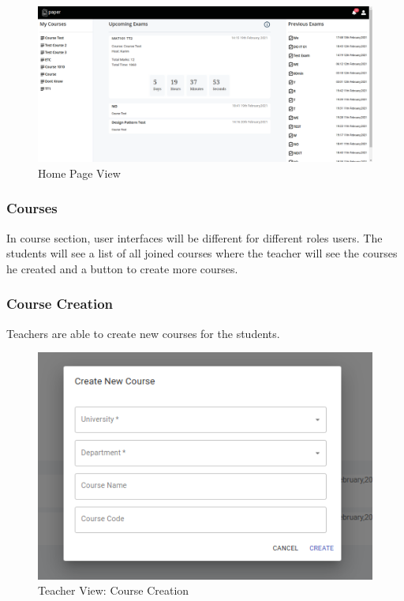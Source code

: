 \documentclass[10pt]{article}
\begin{document}
\begin{figure}[H]
  \centering
  \centerline{\includegraphics[width=\textwidth]{home.png}}
  \caption{Home Page View}
  \label{fig}
\end{figure}

\subsubsection{Courses}
In course section, user interfaces will be different for different roles users.
The students will see a list of all joined courses where the teacher will see the courses he created and a button to create more courses.

\subsubsection{Course Creation}

Teachers are able to create new courses for the students.

\begin{figure}[H]
  \centering
  \centerline{\includegraphics[width=\textwidth]{teacher/course-create.png}}
  \caption{Teacher View: Course Creation}
  \label{fig}
\end{figure}
\end{document}
